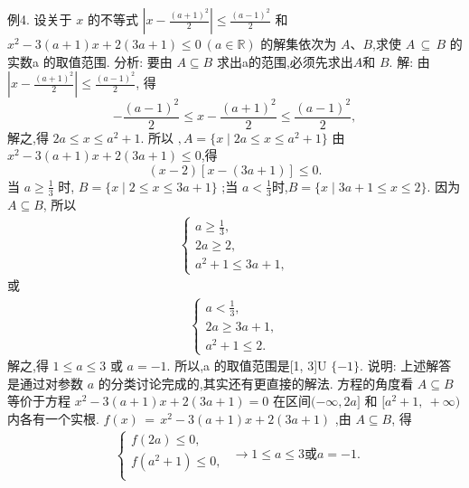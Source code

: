例4. 设关于 $x$ 的不等式 $\left|x-{\frac{(a+1)^{2}}{2}}\right|\leq{\frac{(a-1)^{2}}{2}}$ 和 $x^{2}-3(a+1)x+2(3a+1)\leq0\ (a\in\mathbb{R})$ 的解集依次为 $A$、$B$,求使 $A\,\subseteq\,B$ 的实数a 的取值范围.
分析: 要由 $A\subseteq B$ 求出a的范围,必须先求出$A$和 $B$.
解: 由 $\left|x-{\frac{(a+1)^{2}}{2}}\right|\leqslant{\frac{(a-1)^{2}}{2}}$, 得
$$
-\frac{(a-1)^{2}}{2}\leq x-\frac{(a+1)^{2}}{2}\leq\frac{(a-1)^{2}}{2}, 
$$
解之,得 $2a\leq x\leq a^{2}+1.$ 所以 $,A=\{x\mid2a\leq x\leq a^{2}+1\}$ 
由 $x^{2}-3(a+1)x+2(3a+1)\leq0$,得
$$
(x-2)[x-(3a+1)]\leq0. 
$$
当 $a\geq{\frac{1}{3}}$ 时, $B = \{ x \mid 2 \leq x \leq 3a+1 \}$ ;当 $a<{\frac{1}{3}}$时,$B=\{x \mid 3a+1 \leq x \leq 2 \}.$ 
因为 $A\subseteq B$, 所以
$$
\begin{align*}
\left\{
\begin{aligned}
    a \geq \frac{1}{3}, \\
    2a \geq 2,\\
    a^2+1 \leq 3a+1,
\end{aligned}
\right.
\end{align*}
$$ 
或
$$
\begin{align*}
\left\{
\begin{aligned}
    a < \frac{1}{3}, \\
    2a \geq 3a+1,\\
    a^2+1 \leq 2.
\end{aligned}
\right.
\end{align*}
$$ 
解之,得 $1\leq a\leq3$ 或 $a=-1.$ 
所以,a 的取值范围是[1, 3]U ${\{-1}\}.$ 
说明: 上述解答是通过对参数 $a$ 的分类讨论完成的,其实还有更直接的解法.
方程的角度看 $A\subseteq B$ 等价于方程 $x^{2}-3(a+1)x+2(3a+1)=0$ 在区间$(-\infty,2a]$ 和 $[a^{2}+1,\ +\infty)$ 内各有一个实根.
 $f(x)\,=\,x^{2} - 3(a+1)x+2(3a+1)$ ,由 $A\subseteq B$, 得
$$
\begin{align*}
\left\{
\begin{aligned}
    f(2a) \leq 0, \\
    f(a^2+1) \leq 0,\\
\end{aligned}
\right.
\end{align*}
\longrightarrow 1\leq a \leq 3 \text{或} a=-1.$$ 



